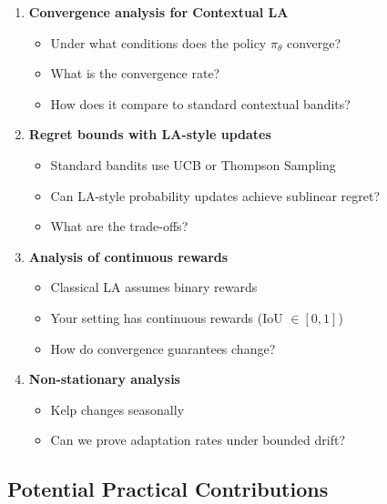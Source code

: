 \documentclass[11pt]{article}
\begin{document}
\begin{enumerate}
  \item \textbf{Convergence analysis for Contextual LA}
  \begin{itemize}
    \item Under what conditions does the policy $\pi_\theta$ converge?
    \item What is the convergence rate?
    \item How does it compare to standard contextual bandits?
  \end{itemize}

  \item \textbf{Regret bounds with LA-style updates}
  \begin{itemize}
    \item Standard bandits use UCB or Thompson Sampling
    \item Can LA-style probability updates achieve sublinear regret?
    \item What are the trade-offs?
  \end{itemize}

  \item \textbf{Analysis of continuous rewards}
  \begin{itemize}
    \item Classical LA assumes binary rewards
    \item Your setting has continuous rewards (IoU $\in [0,1]$)
    \item How do convergence guarantees change?
  \end{itemize}

  \item \textbf{Non-stationary analysis}
  \begin{itemize}
    \item Kelp changes seasonally
    \item Can we prove adaptation rates under bounded drift?
  \end{itemize}
\end{enumerate}

\subsection{Potential Practical Contributions}
\end{document}
